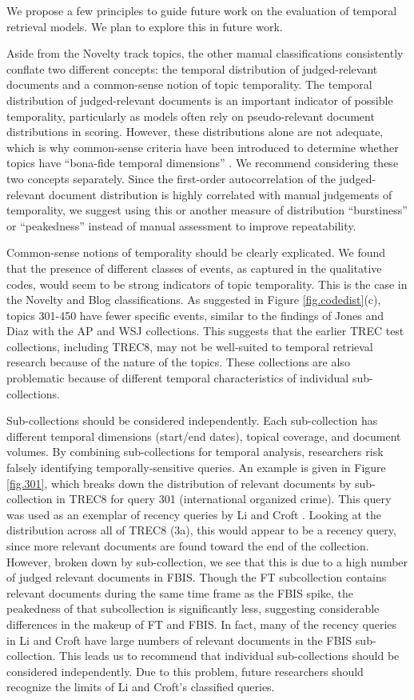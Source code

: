 \documentclass{asist}
\begin{document}
We propose a few principles to guide future work on the evaluation of temporal retrieval models. We plan to explore this in future work.

Aside from the Novelty track topics, the other manual classifications consistently conflate two different concepts: the temporal distribution of judged-relevant documents and a common-sense notion of topic temporality. The temporal distribution of judged-relevant documents is an important indicator of possible temporality, particularly as models often rely on pseudo-relevant document distributions in scoring. However, these distributions alone are not adequate, which is why common-sense criteria have been introduced to determine whether topics have ``bona-fide temporal dimensions'' \cite{Efron2011}. We recommend considering these two concepts separately.  Since the first-order autocorrelation of the judged-relevant document distribution is highly correlated with manual judgements of temporality, we suggest  using this or another measure of distribution ``burstiness'' or ``peakedness'' instead of manual assessment to improve repeatability.

Common-sense notions of temporality should be clearly explicated.  We found that the presence of different classes of events, as captured in the qualitative codes, would seem to be strong indicators of topic temporality.  This is the case in the Novelty and Blog classifications. As suggested in Figure \ref{fig.codedist}(c), topics 301-450 have fewer specific events, similar to the findings of Jones and Diaz with the AP and WSJ collections. This suggests that the earlier TREC test collections, including TREC8, may not be well-suited to temporal retrieval research because of the nature of the topics. These collections are also problematic because of different temporal characteristics of individual sub-collections.

Sub-collections should be considered independently. Each sub-collection has different temporal dimensions (start/end dates), topical coverage, and document volumes. By combining sub-collections for temporal analysis, researchers risk falsely identifying temporally-sensitive queries. An example is given in Figure \ref{fig.301}, which breaks down the distribution of relevant documents by sub-collection in TREC8 for query 301 (international organized crime). This query was used as an exemplar of recency queries by Li and Croft \cite{Li2003}. Looking at the distribution across all of TREC8 (3a), this would appear to be a recency query, since more relevant documents are found toward the end of the collection. However, broken down by sub-collection, we see that this is due to a high number of judged relevant documents in FBIS. Though the FT subcollection contains relevant documents during the same time frame as the FBIS spike, the peakedness of that subcollection is significantly less, suggesting considerable differences in the makeup of FT and FBIS. In fact, many of the recency queries in Li and Croft have large numbers of relevant documents in the FBIS sub-collection.  This leads us to recommend that individual sub-collections should be considered independently. Due to this problem, future researchers should recognize the limits of  Li and Croft's classified queries.
\end{document}
